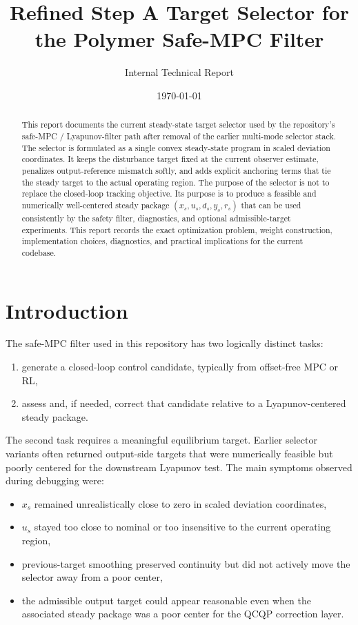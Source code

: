 \documentclass[11pt]{article}
\title{Refined Step A Target Selector for the Polymer Safe-MPC Filter}
\author{Internal Technical Report}
\date{\today}
\begin{document}
\maketitle

\begin{abstract}
This report documents the current steady-state target selector used by the repository's safe-MPC / Lyapunov-filter path after removal of the earlier multi-mode selector stack. The selector is formulated as a single convex steady-state program in scaled deviation coordinates. It keeps the disturbance target fixed at the current observer estimate, penalizes output-reference mismatch softly, and adds explicit anchoring terms that tie the steady target to the actual operating region. The purpose of the selector is not to replace the closed-loop tracking objective. Its purpose is to produce a feasible and numerically well-centered steady package $(x_s,u_s,d_s,y_s,r_s)$ that can be used consistently by the safety filter, diagnostics, and optional admissible-target experiments. This report records the exact optimization problem, weight construction, implementation choices, diagnostics, and practical implications for the current codebase.
\end{abstract}

\section{Introduction}
The safe-MPC filter used in this repository has two logically distinct tasks:
\begin{enumerate}[label=\arabic*.]
\item generate a closed-loop control candidate, typically from offset-free MPC or RL,
\item assess and, if needed, correct that candidate relative to a Lyapunov-centered steady package.
\end{enumerate}

The second task requires a meaningful equilibrium target. Earlier selector variants often returned output-side targets that were numerically feasible but poorly centered for the downstream Lyapunov test. The main symptoms observed during debugging were:
\begin{itemize}
\item $x_s$ remained unrealistically close to zero in scaled deviation coordinates,
\item $u_s$ stayed too close to nominal or too insensitive to the current operating region,
\item previous-target smoothing preserved continuity but did not actively move the selector away from a poor center,
\item the admissible output target could appear reasonable even when the associated steady package was a poor center for the QCQP correction layer.
\end{itemize}
\end{document}
